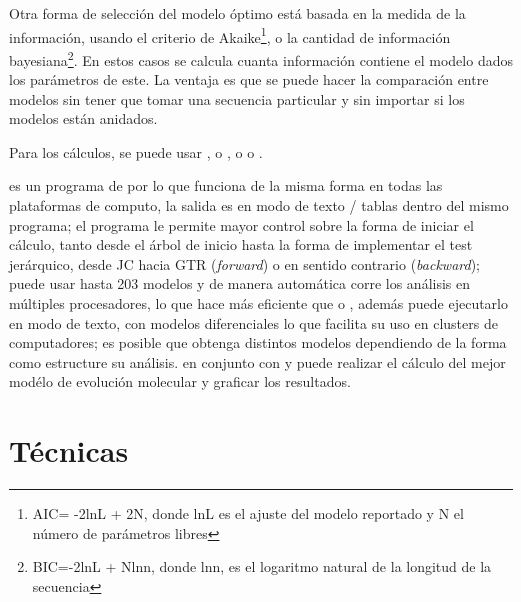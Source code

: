 Otra forma de selecci\'on del modelo \'optimo  est\'a basada en la medida de la informaci\'on, usando el criterio de Akaike\footnote{AIC= -2lnL + 2N, donde lnL es el ajuste del modelo reportado y N el n\'umero de par\'ametros libres}, 
o la cantidad de informaci\'on bayesiana\footnote{BIC=-2lnL + Nlnn, donde lnn, es el logaritmo natural de la longitud de la secuencia}.  
En estos casos se calcula cuanta informaci\'on contiene el modelo dados los par\'ametros de este. La ventaja es que se puede hacer la comparaci\'on entre modelos sin tener que tomar una secuencia particular y sin importar si los modelos est\'an anidados.

Para los c\'alculos, se puede usar , o , o  o . 
 
 es un programa de  por lo que funciona de la misma forma en todas las plataformas de computo, la  salida es en modo de texto / tablas dentro del mismo programa; el programa le permite mayor control sobre la forma de iniciar el c\'alculo, tanto desde el \'arbol de inicio hasta la forma de implementar el test jer\'arquico, desde JC hacia GTR (\textit{forward}) o en sentido contrario  (\textit{backward}); 
puede usar hasta 203 modelos y de manera  autom\'atica corre los an\'alisis en m\'ultiples procesadores, lo que hace m\'as eficiente que  o , adem\'as puede ejecutarlo en modo de texto, con modelos diferenciales lo que facilita su uso en clusters de computadores; es posible que obtenga distintos modelos dependiendo de la forma como estructure su an\'alisis.  en conjunto con  y  puede realizar el c\'alculo del mejor mod\'elo de evoluci\'on molecular y graficar los resultados.




\section*{T\'ecnicas}

%
\noindent


